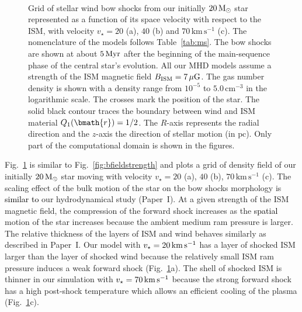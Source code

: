 \documentclass[useAMS,usenatbib]{mn2e}
\begin{document}
\begin{figure}
\begin{minipage}[b]{ 0.48\textwidth}
	\end{minipage} \\  	
	\caption{
		Grid of stellar wind bow shocks from our initially $20\, \rm
M_{\odot}$ star represented as a function of its space velocity with respect to
the ISM, with velocity $v_{\star}=20$ (a), $40$ (b) and $70\, \mathrm{km}\,
\mathrm{s}^{-1}$ (c). The nomenclature of the models follows Table~\ref{tab:ms}.
The bow shocks are shown at about $5\, \rm Myr$ after the beginning of the
main-sequence phase of the central star's evolution. All our MHD models assume a
strength of the ISM magnetic field $B_{\rm ISM}=7\, \mu \rm G$. The gas number density
is shown with a density range from $10^{-5}$ to $5.0\, \mathrm{cm}^{-3}$ in the
logarithmic scale. The crosses mark the position of the star. The solid
black contour traces the boundary between wind and ISM material
$Q_{1}(\bmath{r})=1/2$. The
$R$-axis represents the radial direction and the $z$-axis the direction of
stellar motion (in $\mathrm{pc}$). Only part of the computational domain is
shown in the figures.  
		 }
	\label{fig:motion}  
\end{figure}




Fig.~\ref{fig:motion} is similar to Fig.~\ref{fig:bfieldstrength} and plots a grid of
density field of our initially $20\, \rm M_{\odot}$ star moving with velocity
$v_{\star}=20$ (a), $40$ (b), $70\, \mathrm{km}\, \mathrm{s}^{-1}$ (c). The
scaling effect of the bulk motion of the star on the bow shocks morphology is \textcolor{black}{similar
to} our hydrodynamical study (Paper~I). At a given strength of the ISM magnetic
field, the compression of the forward shock increases as the \textcolor{black}{spatial}
motion of the star increases because the ambient medium ram pressure is larger.
The relative thickness of the layers of ISM and wind behaves similarly as
described in Paper~I. Our model with $v_{\star}=20\, \rm km\, \rm s^{-1}$ has a
layer of shocked ISM larger than the layer of shocked wind because the
relatively small ISM ram pressure induces a weak forward shock
(Fig.~\ref{fig:motion}a). The shell of shocked ISM is thinner in our
simulation with $v_{\star}=70\, \rm km\, \rm s^{-1}$ because the strong forward
shock has a high post-shock temperature which allows an efficient cooling of the
plasma (Fig.~\ref{fig:motion}c). 
\end{document}
